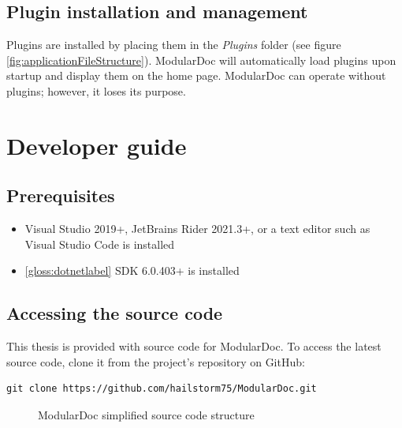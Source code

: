 \subsection{Plugin installation and management}

Plugins are installed by placing them in the \textit{Plugins} folder (see figure \ref{fig:applicationFileStructure}). ModularDoc will automatically load plugins upon startup and display them on the home page. ModularDoc can operate without plugins; however, it loses its purpose.

\section{Developer guide}

\subsection{Prerequisites}

\begin{itemize}
    \item Visual Studio 2019+, JetBrains Rider 2021.3+, or a text editor such as Visual Studio Code is installed
    \item \ref{gloss:dotnetlabel} SDK 6.0.403+ is installed
\end{itemize}

\subsection{Accessing the source code}

This thesis is provided with source code for ModularDoc.
To access the latest source code, clone it from the project's repository on GitHub:

\begin{lstlisting}[caption=Script for cloning the ModularDoc project GitHub repository]
    git clone https://github.com/hailstorm75/ModularDoc.git
\end{lstlisting}

\begin{figure}[H]
    \caption{ModularDoc simplified source code structure}
    \label{fig:sourceCodeFileStructure}
\end{figure}

